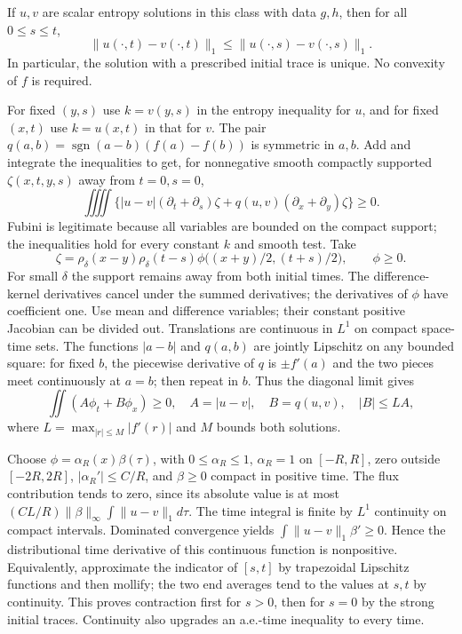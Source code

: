 \begin{theorem}
If $u,v$ are scalar entropy solutions in this class with data $g,h$,
then for all $0\le s\le t$,
\begin{equation}\label{eq:11-contraction}
 \|u(\cdot,t)-v(\cdot,t)\|_1
 \le\|u(\cdot,s)-v(\cdot,s)\|_1.
\end{equation}
In particular, the solution with a prescribed initial trace is unique.
No convexity of $f$ is required.
\end{theorem}
\begin{expandedproof}
For fixed $(y,s)$ use $k=v(y,s)$ in the entropy inequality for $u$,
and for fixed $(x,t)$ use $k=u(x,t)$ in that for $v$. The pair
$q(a,b)=\operatorname{sgn}(a-b)(f(a)-f(b))$ is symmetric in $a,b$.
Add and integrate the inequalities to get, for nonnegative smooth
compactly supported $\zeta(x,t,y,s)$ away from $t=0,s=0$,
\[
 \iiiint \bigl\{|u-v|(\partial_t+\partial_s)\zeta
       +q(u,v)(\partial_x+\partial_y)\zeta\bigr\}\ge0.
\]
Fubini is legitimate because all variables are bounded on the compact
support; the inequalities hold for every constant $k$ and smooth test.
Take
\[
 \zeta=\rho_\delta(x-y)\rho_\delta(t-s)
 \phi\bigl((x+y)/2,(t+s)/2\bigr),\qquad \phi\ge0.
\]
For small $\delta$ the support remains away from both initial times.
The difference-kernel derivatives cancel under the summed derivatives;
the derivatives of $\phi$ have coefficient one.
Use mean and difference variables; their constant positive Jacobian
can be divided out. Translations are continuous in $L^1$ on compact
space-time sets. The functions $|a-b|$ and $q(a,b)$ are jointly
Lipschitz on any bounded square: for fixed $b$, the piecewise derivative
of $q$ is $\pm f'(a)$ and the two pieces meet continuously at $a=b$;
then repeat in $b$. Thus the diagonal limit gives
\begin{equation}\label{eq:11-kato}
 \iint(A\phi_t+B\phi_x)\ge0,\quad
 A=|u-v|,\quad B=q(u,v),\quad |B|\le LA,
\end{equation}
where $L=\max_{|r|\le M}|f'(r)|$ and $M$ bounds both solutions.

Choose $\phi=\alpha_R(x)\beta(\tau)$, with $0\le\alpha_R\le1$,
$\alpha_R=1$ on $[-R,R]$, zero outside $[-2R,2R]$,
$|\alpha_R'|\le C/R$, and $\beta\ge0$ compact in positive time.
The flux contribution tends to zero, since its absolute value is
at most $(CL/R)\|\beta\|_\infty\int\|u-v\|_1d\tau$.
The time integral is finite by $L^1$ continuity on compact intervals.
Dominated convergence yields
$\int\|u-v\|_1\beta'\ge0$. Hence the distributional time derivative
of this continuous function is nonpositive. Equivalently, approximate
the indicator of $[s,t]$ by trapezoidal Lipschitz functions and then
mollify; the two end averages tend to the values at $s,t$ by
continuity. This proves contraction first for $s>0$, then for $s=0$
by the strong initial traces. Continuity also upgrades an a.e.-time
inequality to every time.
\end{expandedproof}
